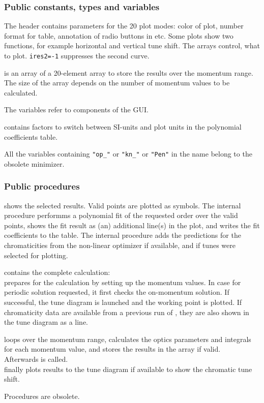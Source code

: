 \documentclass[12pt]{article}
\newcommand\code[1]{{\tt #1}}
\newcommand\guico[1]{{\color{blue}\code{#1}}}
\newcommand{\unico}[1]{{\color{burntorange}\code{#1}}}
\newcommand{\opagui}[1]{\colorbox{blue!20}{{\color{black}\code{#1}}}}
\newcommand{\ogui}[1]{\hyperref[#1]{\opagui{#1}}}
\newcommand{\pvar}[1]{\subsubsection*{Public constants, types and variables} #1}
\newcommand{\ppro}[1]{\subsubsection*{Public procedures} #1}
\newcommand{\todo}[1]{{\color{red} #1}}
\begin{document}
\pvar{
The header contains parameters for the 20 plot modes: color of plot, number format for table, annotation of radio buttons in \ogui{opamomentum} etc. Some plots show two functions, for example horizontal and vertical tune shift. The arrays \unico{ires1,2} control, what to plot. \code{ires2=-1} suppresses the second curve.

\unico{result} is an array of a 20-element array to store the results over the momentum range. The size of the array depends on the number of momentum values to be calculated.

The \unico{...\_HANDLE} variables refer to components of the \guico{opamomentum} GUI.

\unico{res\_funit} contains factors to switch between SI-units and plot units in the polynomial coefficients table.


\todo{All the variables containing \code{"op\_"} or \code{"kn\_"} or \code{"Pen"} in the name belong to the obsolete minimizer.}
}

\ppro{
\unico{Makeplot} shows the selected results. Valid points are plotted as symbols. The internal procedure \unico{fit\_and\_plot} performms a polynomial fit of the requested order over the valid points, shows the fit result as (an) additional line(s) in the plot, and writes the fit coefficients to the table. The internal procedure \unico{plot\_qclines} adds the predictions for the chromaticities from the non-linear optimizer \guico{opachroma} if available, and if tunes were selected for plotting.

\unico{FullCalc} contains the complete calculation:\\
\unico{PreCalc} prepares for the calculation by setting up the momentum values. In case for periodic solution requested, it first checks the on-momentum solution. If successful, the tune diagram \ogui{opatunediag} is launched and the working point is plotted. If chromaticity data are available from a previous run of \guico{opachroma}, they are also shown in the tune diagram as a line.

\unico{Calculate} loops over the momentum range, calculates the optics parameters and integrals for each momentum value, and stores the results in the \unico{result} array if valid.\\
Afterwards \unico{MakePLot} is called.\\
\unico{PostCalc} finally plots results to the tune diagram if available to show the chromatic tune shift.

\todo{Procedures \unico{CalcPenalty, ShowPenalty, CalcTarg} are obsolete.}

}
\end{document}
